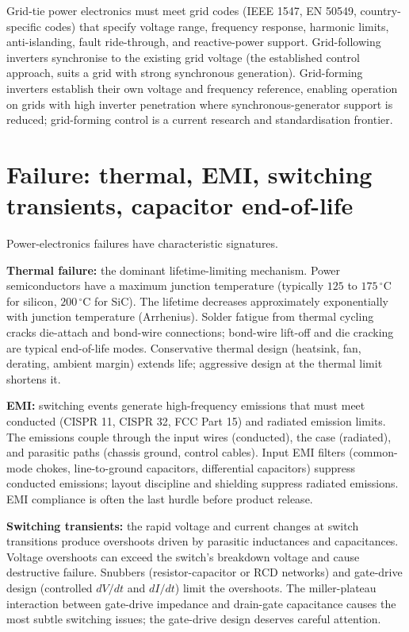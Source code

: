 Grid-tie power electronics must meet grid codes (IEEE 1547, EN 50549, country-specific codes) that specify voltage range, frequency response, harmonic limits, anti-islanding, fault ride-through, and reactive-power support. Grid-following inverters synchronise to the existing grid voltage (the established control approach, suits a grid with strong synchronous generation). Grid-forming inverters establish their own voltage and frequency reference, enabling operation on grids with high inverter penetration where synchronous-generator support is reduced; grid-forming control is a current research and standardisation frontier.

\section{Failure: thermal, EMI, switching transients, capacitor end-of-life}

Power-electronics failures have characteristic signatures.

\textbf{Thermal failure:} the dominant lifetime-limiting mechanism. Power semiconductors have a maximum junction temperature (typically $125$ to $175\,^\circ\text{C}$ for silicon, $200\,^\circ\text{C}$ for SiC). The lifetime decreases approximately exponentially with junction temperature (Arrhenius). Solder fatigue from thermal cycling cracks die-attach and bond-wire connections; bond-wire lift-off and die cracking are typical end-of-life modes. Conservative thermal design (heatsink, fan, derating, ambient margin) extends life; aggressive design at the thermal limit shortens it.

\textbf{EMI:} switching events generate high-frequency emissions that must meet conducted (CISPR 11, CISPR 32, FCC Part 15) and radiated emission limits. The emissions couple through the input wires (conducted), the case (radiated), and parasitic paths (chassis ground, control cables). Input EMI filters (common-mode chokes, line-to-ground capacitors, differential capacitors) suppress conducted emissions; layout discipline and shielding suppress radiated emissions. EMI compliance is often the last hurdle before product release.

\textbf{Switching transients:} the rapid voltage and current changes at switch transitions produce overshoots driven by parasitic inductances and capacitances. Voltage overshoots can exceed the switch's breakdown voltage and cause destructive failure. Snubbers (resistor-capacitor or RCD networks) and gate-drive design (controlled $dV/dt$ and $dI/dt$) limit the overshoots. The miller-plateau interaction between gate-drive impedance and drain-gate capacitance causes the most subtle switching issues; the gate-drive design deserves careful attention.

